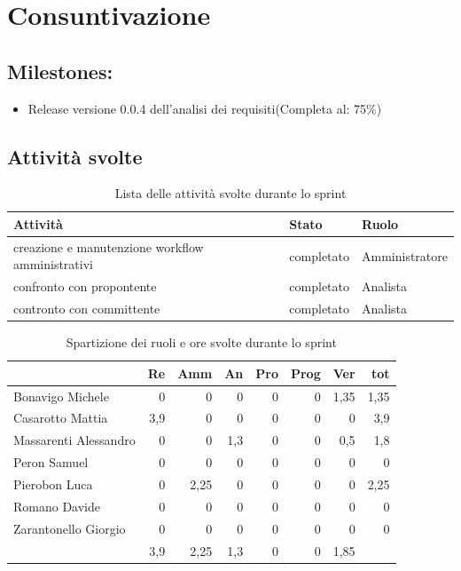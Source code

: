 \section{Consuntivazione}

\subsection{Milestones:}
\begin{itemize}
    \item Release versione 0.0.4 dell'analisi dei requisiti(Completa al: 75\%)
\end{itemize}

\subsection{Attività svolte}

\begin{table}[ht]
    \begin{tabularx}{\textwidth}{X l l}
        
        \rowcolor{gray!30} \textbf{Attività} & \textbf{Stato} & \textbf{Ruolo}\\
        
        \hline
        creazione e manutenzione workflow amministrativi & completato & Amministratore\\
        confronto con propontente & completato & Analista\\
        contronto con committente & completato & Analista\\
        \end{tabularx}
    \caption{Lista delle attività svolte durante lo sprint}
\end{table}


\begin{table}[ht]
    \begin{tabularx}{\linewidth}{X|rrrrrrr}
    \rowcolor{gray!30}& Re & Amm & An & Pro & Prog & Ver & tot \\
    \hline
    Bonavigo Michele                        & 0 & 0 & 0 & 0 & 0 & 1,35  & 1,35 \\
    \rowcolor{gray!10}Casarotto Mattia      & 3,9 & 0 & 0 & 0 & 0 & 0  & 3,9 \\
    Massarenti Alessandro                   & 0 & 0 & 1,3 & 0 & 0 & 0,5  & 1,8 \\
    \rowcolor{gray!10}Peron Samuel          & 0 & 0 & 0 & 0 & 0 & 0 & 0 \\
    Pierobon Luca                           & 0 & 2,25 & 0 & 0 & 0 & 0 & 2,25 \\
    \rowcolor{gray!10}Romano Davide         & 0 & 0 & 0 & 0 & 0 & 0 & 0 \\
    Zarantonello Giorgio                    & 0 & 0 & 0 & 0 & 0 & 0 & 0 \\
    \hline                                  & 3,9 & 2,25 & 1,3 & 0 & 0 & 1,85 & 
    \end{tabularx}
    \caption{\label{ruoli-persone}Spartizione dei ruoli e ore svolte durante lo sprint}
\end{table}

